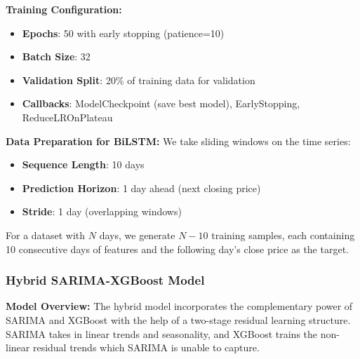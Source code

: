 \documentclass[12pt,a4paper]{article}
\begin{document}
\textbf{Training Configuration:}
\begin{itemize}
    \item \textbf{Epochs}: 50 with early stopping (patience=10)
    \item \textbf{Batch Size}: 32
    \item \textbf{Validation Split}: 20\% of training data for validation
    \item \textbf{Callbacks}: ModelCheckpoint (save best model), EarlyStopping, ReduceLROnPlateau
\end{itemize}

\textbf{Data Preparation for BiLSTM:}
We take sliding windows on the time series:
\begin{itemize}
    \item \textbf{Sequence Length}: 10 days
    \item \textbf{Prediction Horizon}: 1 day ahead (next closing price)
    \item \textbf{Stride}: 1 day (overlapping windows)
\end{itemize}

For a dataset with $N$ days, we generate $N - 10$ training samples, each containing 10 consecutive days of features and the following day's close price as the target.

\subsubsection{Hybrid SARIMA-XGBoost Model}

\textbf{Model Overview:}
The hybrid model incorporates the complementary power of SARIMA and XGBoost with the help of a two-stage residual learning structure. SARIMA takes in linear trends and seasonality, and XGBoost trains the non-linear residual trends which SARIMA is unable to capture.
\end{document}
